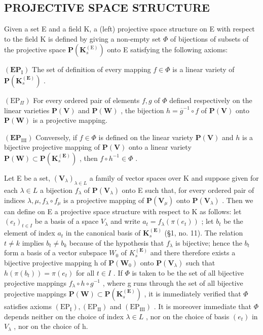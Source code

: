 \subsection{PROJECTIVE SPACE STRUCTURE}

Given a set E and a field K, a (left) projective space structure on E with respect to the field K is defined by giving a non-empty set \(\Phi\) of bijections of subsets of the projective space \(\mathbf{P}(\mathbf{K}_{s}^{\mathrm{(E)}})\) onto E satisfying the following axioms:

\((\mathbf{EP}_{\mathrm{I}})\) The set of definition of every mapping \(f \in \Phi\) is a linear variety of \(\mathbf{P}(\mathbf{K}_s^{(\mathbf{E})})\) .

\((\mathrm{EP}_{\Pi})\) For every ordered pair of elements \(f, g\) of \(\Phi\) defined respectively on the linear varieties \(\mathbf{P}(\mathbf{V})\) and \(\mathbf{P}(\mathbf{W})\) , the bijection \(h = \overline{g}^{-1} \circ f\) of \(\mathbf{P}(\mathbf{V})\) onto \(\mathbf{P}(\mathbf{W})\) is a projective mapping.

\((\mathbf{EP}_{\mathrm{III}})\) Conversely, if \(f \in \Phi\) is defined on the linear variety \(\mathbf{P}(\mathbf{V})\) and \(h\) is a bijective projective mapping of \(\mathbf{P}(\mathbf{V})\) onto a linear variety \(\mathbf{P}(\mathbf{W}) \subset \mathbf{P}(\mathbf{K}_s^{\mathbf{(E)}})\) , then \(f \circ h^{-1} \in \Phi\) .

Let E be a set, \((\mathbf{V}_{\lambda})_{\lambda \in L}\) a family of vector spaces over K and suppose given for each \(\lambda \in L\) a bijection \(f_{\lambda}\) of \(\mathbf{P}(\mathbf{V}_{\lambda})\) onto E such that, for every ordered pair of indices \(\lambda, \mu, f_{\lambda} \circ f_{\mu}\) is a projective mapping of \(\mathbf{P}(\mathbf{V}_{\mu})\) onto \(\mathbf{P}(\mathbf{V}_{\lambda})\) . Then we can define on E a projective space structure with respect to K as follows: let \((e_{t})_{t \in I}\) be a basis of a space \(V_{\lambda}\) and write \(a_{t} = f_{\lambda}(\pi(e_{t}))\) ; let \(b_{t}\) be the element of index \(a_{t}\) in the canonical basis of \(\mathbf{K}_{s}^{(\mathbf{E})}\) (§1, no. 11). The relation \(t \neq k\) implies \(b_{t} \neq b_{k}\) because of the hypothesis that \(f_{\lambda}\) is bijective; hence the \(b_{t}\) form a basis of a vector subspace \(W_{0}\) of \(K_{s}^{(\mathbf{E})}\) and there therefore exists a bijective projective mapping h of \(\mathbf{P}(\mathbf{W}_{0})\) onto \(\mathbf{P}(\mathbf{V}_{\lambda})\) such that \(h(\pi(b_{t})) = \pi(e_{t})\) for all \(t \in I\) . If \(\Phi\) is taken to be the set of all bijective projective mappings \(f_{\lambda} \circ h \circ g^{-1}\) , where g runs through the set of all bijective projective mappings \(\mathbf{P}(\mathbf{W}) \subset \mathbf{P}(\mathbf{K}_{s}^{(\mathbf{E})})\) , it is immediately verified that \(\Phi\) satisfies axioms \((\mathrm{EP}_{\mathrm{I}}), (\mathrm{EP}_{\mathrm{II}})\) and \((\mathrm{EP}_{\mathrm{III}})\) . It is moreover immediate that \(\Phi\) depends neither on the choice of index \(\lambda \in L\) , nor on the choice of basis \((e_{t})\) in \(V_{\lambda}\) , nor on the choice of h.

